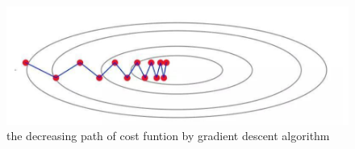 \begin{figure}[htbp] 
\begin{center}
\includegraphics[width=\textwidth]{images/slow}
\caption{the decreasing path of cost funtion by gradient descent algorithm}
\label{fig:slow}
\end{center}
\end{figure}


